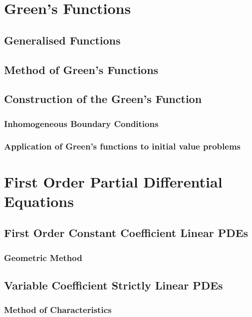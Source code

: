 \documentclass{article}
\theoremstyle{plain}
\theoremstyle{definition}
\numberwithin{equation}{section}
\begin{document}
\section{Green's Functions}

\subsection{Generalised Functions}

\subsection{Method of Green's Functions}

\subsection{Construction of the Green's Function}

\subsubsection{Inhomogeneous Boundary Conditions}

\subsubsection{Application of Green's functions to initial value problems}

\section{First Order Partial Differential Equations}

\subsection{First Order Constant Coefficient Linear PDEs}

\subsubsection{Geometric Method}

\subsection{Variable Coefficient Strictly Linear PDEs}

\subsubsection{Method of Characteristics}
\end{document}
